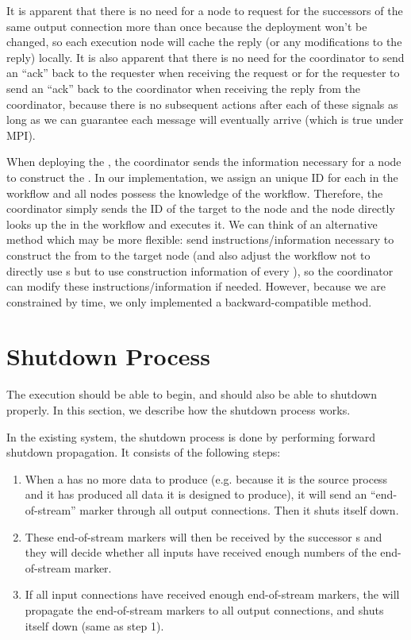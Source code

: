 It is apparent that there is no need for a node to request for the successors of the same output connection more than once because the deployment won't be changed, so each execution node will cache the reply (or any modifications to the reply) locally. It is also apparent that there is no need for the coordinator to send an ``ack'' back to the requester when receiving the request or for the requester to send an ``ack'' back to the coordinator when receiving the reply from the coordinator, because there is no subsequent actions after each of these signals as long as we can guarantee each message will eventually arrive (which is true under MPI).

When deploying the \tPEInst, the coordinator sends the information necessary for a node to construct the \tPEInst. In our implementation, we assign an unique ID for each \tPEInst in the workflow and all nodes possess the knowledge of the workflow. Therefore, the coordinator simply sends the ID of the target \tPEInst to the node and the node directly looks up the \tPEInst in the workflow and executes it. We can think of an alternative method which may be more flexible: send instructions/information necessary to construct the \tPEInst from \tPETmpl to the target node (and also adjust the workflow not to directly use \tPEInst{}s but to use construction information of every \tPEInst{}), so the coordinator can modify these instructions/information if needed. However, because we are constrained by time, we only implemented a backward-compatible method.

\section{Shutdown Process}
The execution should be able to begin, and should also be able to shutdown properly. In this section, we describe how the shutdown process works.

\newcommand{\dEOS}{end-of-stream\xspace}

In the existing \dpy system, the shutdown process is done by performing forward shutdown propagation. It consists of the following steps:
\begin{enumerate}
	\item When a \tPEInst has no more data to produce (e.g. because it is the source process and it has produced all data it is designed to produce), it will send an ``\dEOS'' marker through all output connections. Then it shuts itself down.
	\item These \dEOS markers will then be received by the successor \tPEInst{}s and they will decide whether all inputs have received enough numbers of the \dEOS marker.
	\item If all input connections have received enough \dEOS markers, the \tPEInst will propagate the \dEOS markers to all output connections, and shuts itself down (same as step 1).
\end{enumerate}

